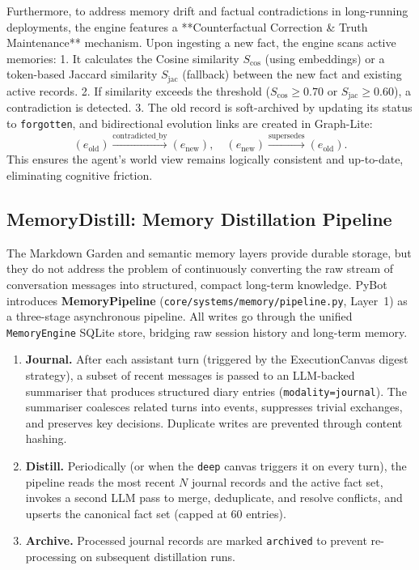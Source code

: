 \documentclass[11pt,a4paper]{article}
\begin{document}
Furthermore, to address memory drift and factual contradictions in long-running deployments, the engine features a **Counterfactual Correction \& Truth Maintenance** mechanism. Upon ingesting a new fact, the engine scans active memories:
1. It calculates the Cosine similarity $S_{\text{cos}}$ (using embeddings) or a token-based Jaccard similarity $S_{\text{jac}}$ (fallback) between the new fact and existing active records.
2. If similarity exceeds the threshold ($S_{\text{cos}} \ge 0.70$ or $S_{\text{jac}} \ge 0.60$), a contradiction is detected.
3. The old record is soft-archived by updating its status to \texttt{forgotten}, and bidirectional evolution links are created in Graph-Lite:
   \[
     (e_{\text{old}}) \xrightarrow{\text{contradicted\_by}} (e_{\text{new}}),\quad (e_{\text{new}}) \xrightarrow{\text{supersedes}} (e_{\text{old}}).
   \]
This ensures the agent's world view remains logically consistent and up-to-date, eliminating cognitive friction.

\subsection{MemoryDistill: Memory Distillation Pipeline}
\label{sec:deep-digest}

The Markdown Garden and semantic memory layers provide durable storage, but they do not address the problem of continuously converting the raw stream of conversation messages into structured, compact long-term knowledge.
PyBot introduces \textbf{MemoryPipeline} (\texttt{core/systems/memory/pipeline.py}, Layer~1) as a three-stage asynchronous pipeline. All writes go through the unified \texttt{MemoryEngine} SQLite store, bridging raw session history and long-term memory.

\begin{enumerate}[label=\textbf{Stage~\arabic*.}]
  \item \textbf{Journal.} After each assistant turn (triggered by the ExecutionCanvas digest strategy), a subset of recent messages is passed to an LLM-backed summariser that produces structured diary entries (\texttt{modality=journal}). The summariser coalesces related turns into events, suppresses trivial exchanges, and preserves key decisions. Duplicate writes are prevented through content hashing.
  \item \textbf{Distill.} Periodically (or when the \texttt{deep} canvas triggers it on every turn), the pipeline reads the most recent $N$ journal records and the active fact set, invokes a second LLM pass to merge, deduplicate, and resolve conflicts, and upserts the canonical fact set (capped at 60 entries).
  \item \textbf{Archive.} Processed journal records are marked \texttt{archived} to prevent re-processing on subsequent distillation runs.
\end{enumerate}
\end{document}
